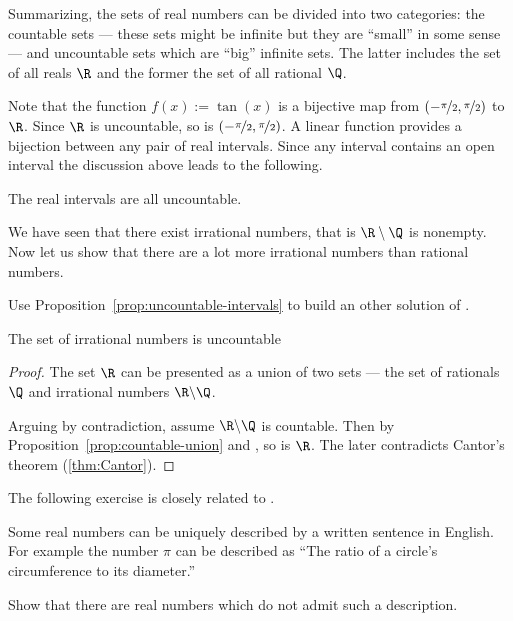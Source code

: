 \documentclass[12pt]{book}
\begin{document}
Summarizing, the sets of real numbers can be divided into two categories: 
the countable sets --- these sets might be infinite but they are  ``small'' in some sense --- and uncountable sets which are ``big'' infinite sets.
The latter includes the set of all reals $\R$ and the former the set of all rational $\Q$.

Note that the function $f(x) := \tan(x)$ is a bijective map from $(-\nicefrac{\pi}{2},\nicefrac{\pi}{2})$ to $\R$.  
Since $\R$ is uncountable, so is $(-\nicefrac{\pi}{2},\nicefrac{\pi}{2})$.  
A linear function provides a bijection between any pair of real intervals.
Since any interval contains an open interval the discussion above leads to the following.

\begin{prop}\label{prop:uncountable-intervals}
The real intervals are all uncountable.
\end{prop}

We have seen that there exist irrational numbers, that is
$\R \setminus \Q$ is nonempty. 
Now let us show that there are a lot more irrational numbers than rational
numbers.

\begin{exercise} Use Proposition~\ref{prop:uncountable-intervals} to build an other solution of .
\end{exercise}


\begin{prop}
The set of irrational numbers is uncountable
\end{prop}

\begin{proof}
The set $\R$ can be presented as a union of two sets --- the set of rationals $\Q$ and irrational numbers $\R\backslash \Q$.

Arguing by contradiction, assume $\R\backslash \Q$ is countable.
Then by Proposition~\ref{prop:countable-union} and , so is $\R$.
The later contradicts Cantor's theorem (\ref{thm:Cantor}).
\end{proof}

The following exercise is closely related to .

\begin{exercise}
Some real numbers can be uniquely described by a written sentence in English.
For example the number $\pi$ can be described as
``The ratio of a circle's circumference to its diameter.''

Show that there are real numbers which do not admit such a description.
\end{exercise}
\end{document}

